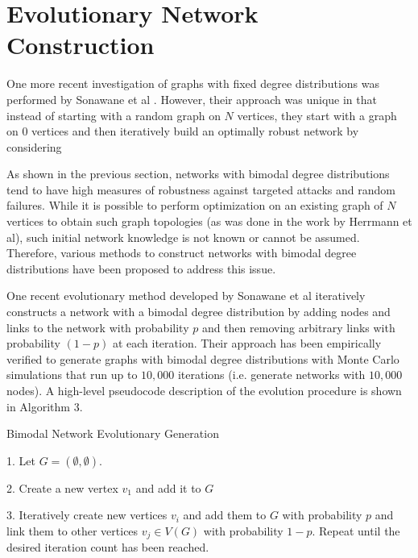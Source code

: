 \documentclass[doc]{apa}%
\begin{document}

\section{Evolutionary Network Construction}
One more recent investigation of graphs with fixed degree distributions was performed by Sonawane et al \cite{bimodal}. However, their approach was unique in that instead of starting with a random graph on $N$ vertices, they start with a graph on $0$ vertices and then iteratively build an optimally robust network by considering 

As shown in the previous section, networks with bimodal degree distributions tend to have high measures of robustness against targeted attacks and random failures. While it is possible to perform optimization on an existing graph of $N$ vertices to obtain such graph topologies (as was done in the work by Herrmann et al), such initial network knowledge is not known or cannot be assumed. Therefore, various methods to construct networks with bimodal degree distributions have been proposed to address this issue. 

One recent evolutionary method developed by Sonawane et al iteratively constructs a network with a bimodal degree distribution by adding nodes and links to the network with probability $p$ and then removing arbitrary links with probability $(1-p)$ at each iteration. Their approach has been empirically verified to generate graphs with bimodal degree distributions with Monte Carlo simulations that run up to $10,000$ iterations (i.e. generate networks with $10,000$ nodes).  A high-level pseudocode description of the evolution procedure is shown in Algorithm 3.

\begin{algorithm}
\caption{Bimodal Network Evolutionary Generation}
\label{alg2}
\begin{algorithmic}
	\item 1. Let $G = (\emptyset, \emptyset)$. 
	\item 2. Create a new vertex $v_1$ and add it to $G$
	\item 3. Iteratively create new vertices $v_i$ and add them to $G$ with probability $p$ and link them to other vertices $v_j \in V(G)$ with probability $1-p$. Repeat until the desired iteration count has been reached.
\end{algorithmic}
\end{algorithm}
\end{document}
